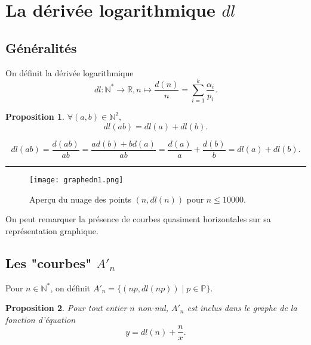 \documentclass[a4paper, 12pt]{article}
\newcommand{\N}{\mathbb{N}}
\newcommand{\R}{\mathbb{R}}
\newcommand{\Pm}{\mathbb{P}}
\newcommand{\Prv}{\noindent{\it Preuve. }}
\newcommand{\cqfd}{\rule{0.2cm}{0.2cm}}
\newtheorem{prop}{Proposition}
\begin{document}



\section{La dérivée logarithmique $dl$}
\subsection{Généralités}

On définit la dérivée logarithmique \[dl : \N^{*} \longrightarrow \R, n \mapsto \frac{d(n)}{n} = \sum_{i=1}^{k} \frac{\alpha_i}{p_i}. \]

\begin{prop} \label{prop5}
$\forall (a,b) \in \N^{2},$
 \begin{equation} \label{eq5} dl(ab)=dl(a)+dl(b).
\end{equation}
\end{prop}
\Prv \[dl(ab) = \frac{d(ab)}{ab}=\frac{ad(b)+bd(a)}{ab}=\frac{d(a)}{a}+\frac{d(b)}{b}=dl(a)+dl(b).\] \cqfd



\begin{figure}[ht]
\begin{center}
\texttt{[image: graphedn1.png]}
\end{center}
\caption{\footnotesize{Aperçu du nuage des points $(n, dl(n))$ pour $n \le 10000$.}}
\label{nuagen 1}
\end{figure}


On peut remarquer la présence de courbes quasiment horizontales sur sa représentation graphique.\\
\subsection{Les "courbes" $A'_n$}
Pour $n \in \N^{*}$, on définit $A'_n= \{(np, dl(np)) \mid p \in \Pm \}.$

\begin{prop} \label{prop6}
Pour tout entier $n$ non-nul, $A'_n$ est inclus dans le graphe de la fonction d'équation \begin{equation} \label{eq6} y=dl(n) + \frac{n}{x}. \end{equation}
\end{prop}
\end{document}
